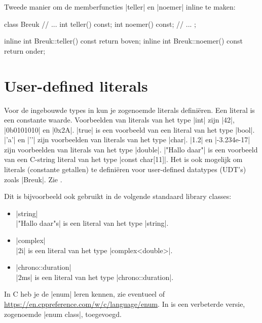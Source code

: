 \begin{cpplstShortInline}
Tweede manier om de memberfuncties |teller| en |noemer| inline te maken:
\begin{cpplstfragment}
class Breuk {
//  ...
    int teller() const;
    int noemer() const;
//  ...
};

inline int Breuk::teller() const {
    return boven;
}
inline int Breuk::noemer() const {
    return onder;
}
\end{cpplstfragment}

\section{User-defined literals}
\label{user-definedliterals}
Voor de ingebouwde types in \Cpp{} kun je zogenoemde literals definiëren.
Een literal is een constante waarde.
Voorbeelden van literals van het type |int| zijn |42|, |0b0101010| en |0x2A|.
|true| is een voorbeeld van een literal van het type |bool|.
|'a'| en |'\n'| zijn voorbeelden van literals van het type |char|.
|1.2| en |-3.234e-17| zijn voorbeelden van literals van het type |double|.
|"Hallo daar"| is een voorbeeld van een C-string literal van het type |const char[11]|.
Het is ook mogelijk om literals (constante getallen) te definiëren voor user-defined datatypes (UDT's) zoals |Breuk|.
Zie .

Dit is bijvoorbeeld ook gebruikt in de volgende standaard library classes:
\begin{itemize}
	\item |string|\\
	|"Hallo daar"s| is een literal van het type |string|.
	\item |complex|\\
	|2i| is een literal van het type |complex<double>|.
	\item |chrono::duration|\\
	|2ms| is een literal van het type |chrono::duration|.
\end{itemize}   

\label{sec:enumclass}
In C heb je de |enum| leren kennen, zie eventueel \cite[paragraaf 5.6.2]{Gustedt2019} of \url{https://en.cppreference.com/w/c/language/enum}.
In \Cpp{} is een verbeterde versie, zogenoemde |enum class|, toegevoegd.


\end{cpplstShortInline}
